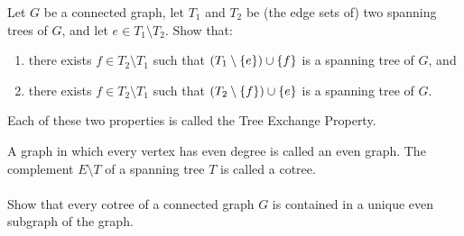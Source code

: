 \documentclass{article}
\begin{document}
\begin{exercise}
Let $G$ be a connected graph, let $T_1$ and $T_2$ be (the edge sets of) two spanning trees of $G$, and let $e\in T_1\setminus T_2$. Show that:
\begin{enumerate}
 \item there exists $f\in T_2\setminus T_1$ such that $\left( T_1\setminus\left\{ e \right\} \right)\cup\left\{ f \right\}$ is a spanning tree of $G$, and
 \item there exists $f\in T_2\setminus T_1$ such that $\left( T_2\setminus\left\{ f \right\} \right)\cup\left\{ e \right\}$ is a spanning tree of $G$.
\end{enumerate}
\begin{note}
Each of these two properties is called the Tree Exchange Property.
\end{note}
\begin{answer}

\end{answer}
\end{exercise}

\begin{exercise}
A graph in which every vertex has even degree is called an even graph. The complement $E\setminus T$ of a spanning tree $T$ is called a cotree.
\paragraph{}
Show that every cotree of a connected graph $G$ is contained in a unique even subgraph of the graph.
\begin{answer}

\end{answer}
\end{exercise}
\end{document}
